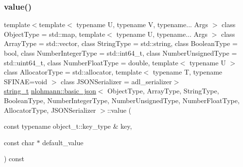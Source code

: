 \mbox{\label{classnlohmann_1_1basic__json_ad6a18403e7fbac9c4efd06facc71fc88}} 
\subsubsection{\texorpdfstring{value()}{value()}\hspace{0.1cm}{\footnotesize\ttfamily [2/4]}}
{\footnotesize\ttfamily template$<$template$<$ typename U, typename V, typename... Args $>$ class Object\+Type = std\+::map, template$<$ typename U, typename... Args $>$ class Array\+Type = std\+::vector, class String\+Type  = std\+::string, class Boolean\+Type  = bool, class Number\+Integer\+Type  = std\+::int64\+\_\+t, class Number\+Unsigned\+Type  = std\+::uint64\+\_\+t, class Number\+Float\+Type  = double, template$<$ typename U $>$ class Allocator\+Type = std\+::allocator, template$<$ typename T, typename S\+F\+I\+N\+A\+E=void $>$ class J\+S\+O\+N\+Serializer = adl\+\_\+serializer$>$ \\
\mbox{\hyperlink{classnlohmann_1_1basic__json_a61f8566a1a85a424c7266fb531dca005}{string\+\_\+t}} \mbox{\hyperlink{classnlohmann_1_1basic__json}{nlohmann\+::basic\+\_\+json}}$<$ Object\+Type, Array\+Type, String\+Type, Boolean\+Type, Number\+Integer\+Type, Number\+Unsigned\+Type, Number\+Float\+Type, Allocator\+Type, J\+S\+O\+N\+Serializer $>$\+::value (\begin{DoxyParamCaption}\item[{const typename object\+\_\+t\+::key\+\_\+type \&}]{key,  }\item[{const char $\ast$}]{default\+\_\+value }\end{DoxyParamCaption}) const\hspace{0.3cm}{\ttfamily [inline]}}



